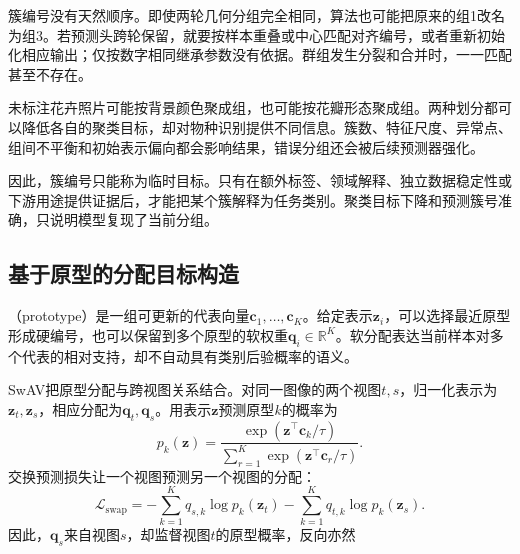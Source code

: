 簇编号没有天然顺序。即使两轮几何分组完全相同，算法也可能把原来的组1改名为组3。若预测头跨轮保留，就要按样本重叠或中心匹配对齐编号，或者重新初始化相应输出；仅按数字相同继承参数没有依据。群组发生分裂和合并时，一一匹配甚至不存在。

未标注花卉照片可能按背景颜色聚成组，也可能按花瓣形态聚成组。两种划分都可以降低各自的聚类目标，却对物种识别提供不同信息。簇数、特征尺度、异常点、组间不平衡和初始表示偏向都会影响结果，错误分组还会被后续预测器强化。

因此，簇编号只能称为临时目标。只有在额外标签、领域解释、独立数据稳定性或下游用途提供证据后，才能把某个簇解释为任务类别。聚类目标下降和预测簇号准确，只说明模型复现了当前分组。

\subsection{基于原型的分配目标构造}
\label{sec:data-derived-knowledge-prototype-targets}

（prototype）是一组可更新的代表向量$\bm{c}_1,\ldots,\bm{c}_K$。给定表示$\bm{z}_i$，可以选择最近原型形成硬编号，也可以保留到多个原型的软权重$\bm{q}_i\in\mathbb{R}^{K}$。软分配表达当前样本对多个代表的相对支持，却不自动具有类别后验概率的语义。

SwAV把原型分配与跨视图关系结合。对同一图像的两个视图$t,s$，归一化表示为$\bm{z}_t,\bm{z}_s$，相应分配为$\bm{q}_t,\bm{q}_s$。用表示$\bm{z}$预测原型$k$的概率为
\[
  p_k(\bm{z})
  =\frac{\exp(\bm{z}^{\top}\bm{c}_k/\tau)}
  {\sum_{r=1}^{K}\exp(\bm{z}^{\top}\bm{c}_r/\tau)}.
\]
交换预测损失让一个视图预测另一个视图的分配：
\begin{equation}
  \mathcal{L}_{\mathrm{swap}}
  =-\sum_{k=1}^{K}q_{s,k}\log p_k(\bm{z}_t)
   -\sum_{k=1}^{K}q_{t,k}\log p_k(\bm{z}_s).
  \label{eq:data-derived-knowledge-swav-swap}
\end{equation}
因此，$\bm{q}_s$来自视图$s$，却监督视图$t$的原型概率，反向亦然

